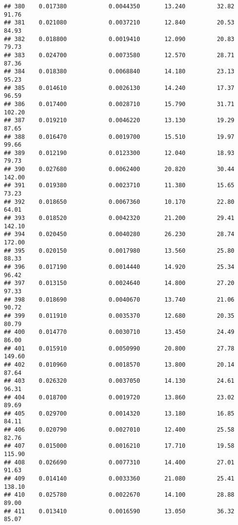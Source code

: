 \documentclass[
]{article}
\begin{document}
\begin{verbatim}
## 380    0.017380            0.0044350       13.240         32.82           91.76
## 381    0.021080            0.0037210       12.840         20.53           84.93
## 382    0.018800            0.0019410       12.090         20.83           79.73
## 383    0.024700            0.0073580       12.570         28.71           87.36
## 384    0.018380            0.0068840       14.180         23.13           95.23
## 385    0.014610            0.0026130       14.240         17.37           96.59
## 386    0.017400            0.0028710       15.790         31.71          102.20
## 387    0.019210            0.0046220       13.130         19.29           87.65
## 388    0.016470            0.0019700       15.510         19.97           99.66
## 389    0.012190            0.0123300       12.040         18.93           79.73
## 390    0.027680            0.0062400       20.820         30.44          142.00
## 391    0.019380            0.0023710       11.380         15.65           73.23
## 392    0.018650            0.0067360       10.170         22.80           64.01
## 393    0.018520            0.0042320       21.200         29.41          142.10
## 394    0.020450            0.0040280       26.230         28.74          172.00
## 395    0.020150            0.0017980       13.560         25.80           88.33
## 396    0.017190            0.0014440       14.920         25.34           96.42
## 397    0.013150            0.0024640       14.800         27.20           97.33
## 398    0.018690            0.0040670       13.740         21.06           90.72
## 399    0.011910            0.0035370       12.680         20.35           80.79
## 400    0.014770            0.0030710       13.450         24.49           86.00
## 401    0.015910            0.0050990       20.800         27.78          149.60
## 402    0.010960            0.0018570       13.800         20.14           87.64
## 403    0.026320            0.0037050       14.130         24.61           96.31
## 404    0.018700            0.0019720       13.860         23.02           89.69
## 405    0.029700            0.0014320       13.180         16.85           84.11
## 406    0.020790            0.0027010       12.400         25.58           82.76
## 407    0.015000            0.0016210       17.710         19.58          115.90
## 408    0.026690            0.0077310       14.400         27.01           91.63
## 409    0.014140            0.0033360       21.080         25.41          138.10
## 410    0.025780            0.0022670       14.100         28.88           89.00
## 411    0.013410            0.0016590       13.050         36.32           85.07

\end{verbatim}
\end{document}
